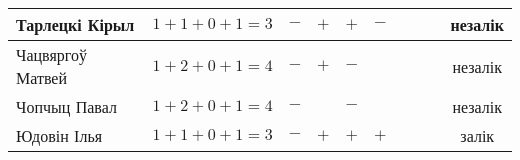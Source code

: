 \documentclass[12pt, a4paper]{extarticle}
\begin{document}
\begin{table}[H]
\begin{minipage}{\textwidth}
\begin{tabular}{|l|c|c|c|c|c|c|c|c|c|}
                Тарлецкі Кірыл      &   $1+1+0+1=3$   & $-$  & $+$ & $+$ & $-$ &     &     &     & незалік \\ \hline
                Чацвяргоў Матвей    &   $1+2+0+1=4$   & $-$  & $+$ & $-$ &     &     &     &     & незалік \\ \hline
                Чопчыц Павал        &   $1+2+0+1=4$   & $-$  &     & $-$ &     &     &     &     & незалік \\ \hline
                Юдовін Ілья         &   $1+1+0+1=3$   & $-$  & $+$ & $+$ & $+$ &     &     &     &  залік  \\ \hline
            \end{tabular}
        \end{minipage}
    \end{table}
\end{document}
